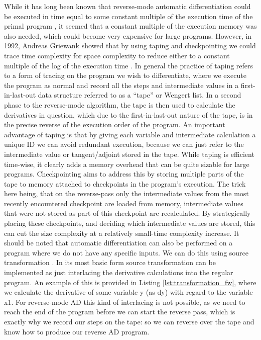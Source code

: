         While it has long been known that reverse-mode automatic differentiation could be executed in time equal to some constant multiple of the execution time of the primal program \cite{linnainmaa1976taylor}, it seemed that a constant multiple of the execution memory was also needed, which could become very expensive for large programs.
        However, in 1992, Andreas Griewank showed that by using taping and checkpointing we could trace time complexity for space complexity to reduce either to a constant multiple of the log of the execution time \cite{griewank1992achieving}.
        In general the practice of taping refers to a form of tracing on the program we wish to differentiate, where we execute the program as normal and record all the steps and intermediate values in a first-in-last-out data structure referred to as a ``tape'' or Wengert list.
        In a second phase to the reverse-mode algorithm, the tape is then used to calculate the derivatives in question, which due to the first-in-last-out nature of the tape, is in the precise reverse of the execution order of the program.
        An important advantage of taping is that by giving each variable and intermediate calculation a unique ID we can avoid redundant execution, because we can just refer to the intermediate value or tangent/adjoint stored in the tape.
        While taping is efficient time-wise, it clearly adds a memory overhead that can be quite sizable for large programs.
        Checkpointing aims to address this by storing multiple parts of the tape to memory attached to checkpoints in the program's execution.
        The trick here being, that on the reverse-pass only the intermediate values from the most recently encountered checkpoint are loaded from memory, intermediate values that were not stored as part of this checkpoint are recalculated.
        By strategically placing these checkpoints, and deciding which intermediate values are stored, this can cut the size complexity at a relatively small-time complexity increase.
        It should be noted that automatic differentiation can also be performed on a program where we do not have any specific inputs.
        We can do this using source transformation \cite{bischof2000computing}.
        In its most basic form source transformation can be implemented as just interlacing the derivative calculations into the regular program.
        An example of this is provided in Listing \ref{lst:transformation_fw}, where we calculate the derivative of some variable y (as dy) with regard to the variable x1.
        For reverse-mode AD this kind of interlacing is not possible, as we need to reach the end of the program before we can start the reverse pass, which is exactly why we record our steps on the tape: so we can reverse over the tape and know how to produce our reverse AD program.

